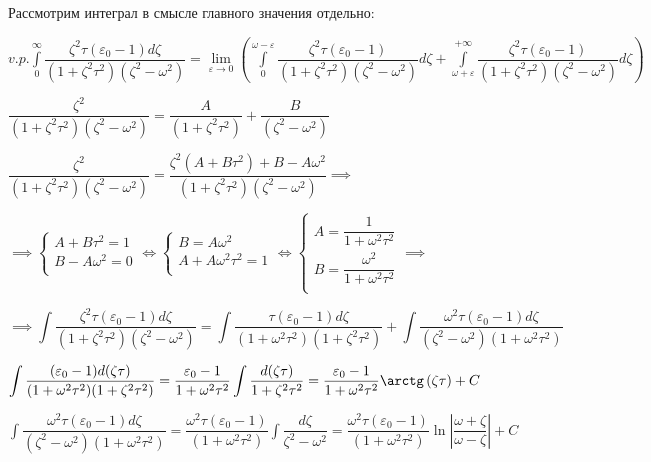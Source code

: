 \documentclass[a4paper,12pt]{article}
\begin{document}
	\quad Рассмотрим интеграл в смысле главного значения отдельно:
	
	\begin{center}
		$v.p.\displaystyle\int\limits_{0}^{\infty} \dfrac{\zeta^2\tau(\varepsilon_0-1)d\zeta}{(1+\zeta^2 \tau^2)(\zeta^2 - \omega^2)} = \lim\limits_{\varepsilon \to 0}\left( \displaystyle\int\limits_{0}^{\omega-\varepsilon} \dfrac{\zeta^2\tau(\varepsilon_0 - 1)}{(1+\zeta^2 \tau^2)(\zeta^2 - \omega^2)}d\zeta + \displaystyle\int\limits_{\omega+\varepsilon}^{+\infty} \dfrac{\zeta^2 \tau (\varepsilon_0 - 1)}{(1+\zeta^2 \tau^2)(\zeta^2 - \omega^2)}d\zeta \right)$
		
		$\dfrac{\zeta^2 }{(1+\zeta^2\tau^2)(\zeta^2-\omega^2)} =  \dfrac{A}{(1+\zeta^2\tau^2)} + \dfrac{B}{(\zeta^2 - \omega^2)}$
		
		$\dfrac{\zeta^2}{(1+\zeta^2\tau^2)(\zeta^2 - \omega^2)} = \dfrac{\zeta^2(A + B\tau^2) + B - A\omega^2}{(1+\zeta^2 \tau^2)(\zeta^2 - \omega^2)} \implies $
		
		$\implies \begin{cases}
			A + B\tau^2 = 1 \\
			B - A\omega^2 = 0 \\
		\end{cases} \Leftrightarrow \begin{cases}
			B = A\omega^2 \\
			A + A\omega^2\tau^2 = 1 \\
		\end{cases} \Leftrightarrow \begin{cases}
			A = \dfrac{1}{1 + \omega^2\tau^2} \\
			B = \dfrac{\omega^2}{1+\omega^2\tau^2}\\
		\end{cases} \implies $
		
	\end{center}
	
	\begin{equation}
		\implies \displaystyle\int \dfrac{\zeta^2\tau(\varepsilon_0 - 1)d\zeta}{(1+\zeta^2\tau^2)(\zeta^2 - \omega^2)} = \displaystyle\int \dfrac{\tau(\varepsilon_0 - 1)d\zeta}{(1+\omega^2 \tau^2)(1+\zeta^2\tau^2)} + \displaystyle\int \dfrac{\omega^2\tau(\varepsilon_0 - 1)d\zeta}{(\zeta^2 - \omega^2)(1+\omega^2 \tau^2)}
	\end{equation}
	
	\begin{center}
		$\displaystyle\int\dfrac{(\varepsilon_0 - 1)d(\zeta\tau)}{(1+\omega^2 \tau^2)(1+\zeta^2\tau^2)} = \dfrac{\varepsilon_0 - 1}{1+\omega^2\tau^2} \displaystyle\int \dfrac{d(\zeta\tau)}{1 + \zeta^2\tau^2} = \dfrac{\varepsilon_0 - 1}{1+\omega^2 \tau^2} \arctg\left(\zeta\tau\right) + C$
		
		$\displaystyle\int \dfrac{\omega^2\tau(\varepsilon_0 - 1)d\zeta}{(\zeta^2 - \omega^2)(1+\omega^2\tau^2)} = \dfrac{\omega^2\tau (\varepsilon_0 - 1)}{(1+\omega^2\tau^2)} \displaystyle\int\dfrac{d\zeta}{\zeta^2 - \omega^2} = \dfrac{\omega^2 \tau(\varepsilon_0 - 1)}{(1+\omega^2 \tau^2)} \ln \left|\dfrac{\omega+\zeta}{\omega - \zeta}\right| + C$ 
	\end{center}
	
\end{document}
